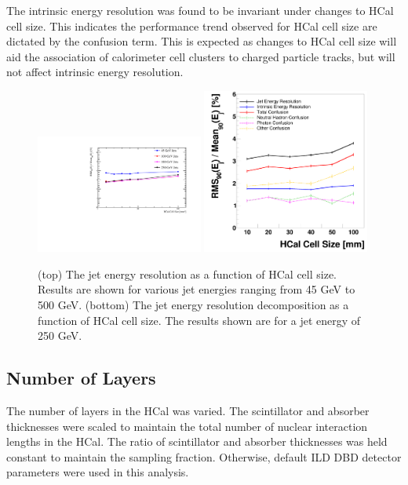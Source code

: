 \documentclass[final,3p,times,twocolumn]{elsarticle}
\begin{document}
The intrinsic energy resolution was found to be invariant under changes to HCal cell size.  This indicates the performance trend observed for HCal cell size are dictated by the confusion term.  This is expected as changes to HCal cell size will aid the association of calorimeter cell clusters to charged particle tracks, but will not affect intrinsic energy resolution.

\begin{figure}[!h]
  \begin{center}
     \includegraphics[width=0.49\textwidth]{6_HCalParamScan/JER_vs_HCalCellSize.pdf}
     \includegraphics[width=0.49\textwidth]{JERBreakdownvsHCalCellSize500GeVDiJetHCalTC10ns.png}
     \caption{ (top) The jet energy resolution as a function of HCal cell size.  Results are shown for various jet energies ranging from 45 GeV to 500 GeV.  (bottom) The jet energy resolution decomposition as a function of HCal cell size.  The results shown are for a jet energy of 250 GeV.  \label{HCalCellSize}}
  \end{center}
\end{figure}

\subsection{Number of Layers}
The number of layers in the HCal was varied.  The scintillator and absorber thicknesses were scaled to maintain the total number of nuclear interaction lengths in the HCal.  The ratio of scintillator and absorber thicknesses was held constant to maintain the sampling fraction.  Otherwise, default ILD DBD detector parameters were used in this analysis.
\end{document}
